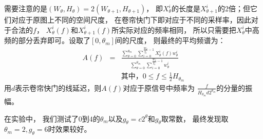 需要注意的是$(W_\theta, H_\theta) = 2(W_{\theta+1}, H_{\theta+1})$，
即$X_\theta^i$的长度是$X_{\theta+1}^i$的2倍；但它们对应于原图上不同的空间尺度，
在卷帘快门下即对应于不同的采样率，因此对于合法的$f$，
$X_\theta^i(f)$和$X_{\theta+1}^i(f)$所实际对应的频率相同，
所以只需要把$X_\theta^i$中高频的部分丢弃即可。设取了$[0, \theta_m]$间的尺度，
则最终的平均频谱为：
\begin{eqnarray}
    A(f) &=& \frac{\sum_{\theta=0}^{\theta_m}
    \sum_{i=0}^{\frac{W_\theta}{g_\theta} - 1}X_\theta^i(f)w_\theta^i}
    {\sum_{\theta=0}^{\theta_m}
    \sum_{i=0}^{\frac{W_\theta}{g_\theta} - 1}w_\theta^i} \\
    && \text{其中，} 0 \le f \le \frac{1}{2}H_{\theta_m} \nonumber
\end{eqnarray}
用$d$表示卷帘快门的线延迟，则$A(f)$对应于原信号中频率为
$\frac{f}{H_{\theta_m}d2^{\theta_m}}$的分量的振幅。

在实验中，
我们测试了$0$到$4$的$\theta_m$以及$g_\theta=c2^\theta$和$g_\theta$取常数，
最终发现取$\theta_m=2, g_\theta=6$时效果较好。



